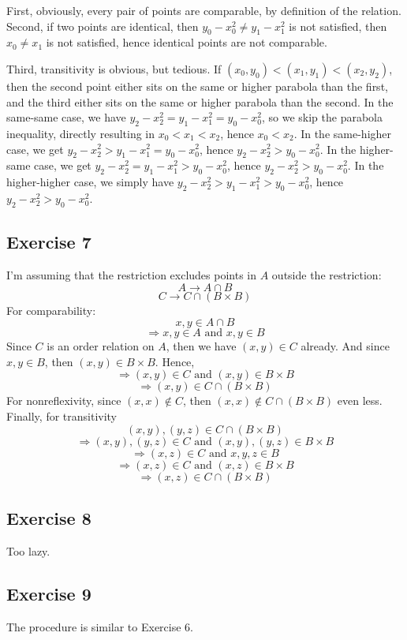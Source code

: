\documentclass{book}
\begin{document}
First, obviously, every pair of points are comparable, by definition of the relation. Second, if two points are identical, then $y_0 - x_0^2 \neq y_1 - x_1^2$ is not satisfied, then $x_0 \neq x_1$ is not satisfied, hence identical points are not comparable.

Third, transitivity is obvious, but tedious. If $(x_0, y_0) < (x_1, y_1) < (x_2, y_2)$, then the second point either sits on the same or higher parabola than the first, and the third either sits on the same or higher parabola than the second. In the same-same case, we have $y_2 - x_2^2 = y_1 - x_1^2 = y_0 - x_0^2$, so we skip the parabola inequality, directly resulting in $x_0 < x_1 < x_2$, hence $x_0 < x_2$. In the same-higher case, we get $y_2 - x_2^2 > y_1 - x_1^2 = y_0 - x_0^2$, hence $y_2 - x_2^2 > y_0 - x_0^2$. In the higher-same case, we get $y_2 - x_2^2 = y_1 - x_1^2 > y_0 - x_0^2$, hence $y_2 - x_2^2 > y_0 - x_0^2$. In the higher-higher case, we simply have $y_2 - x_2^2 > y_1 - x_1^2 > y_0 - x_0^2$, hence $y_2 - x_2^2 > y_0 - x_0^2$.

\subsection*{Exercise 7}
I'm assuming that the restriction excludes points in $A$ outside the restriction:
$$A \rightarrow A \cap B$$
$$C \rightarrow C \cap (B \times B)$$
For comparability:
$$x, y \in A \cap B$$
$$\Rightarrow x, y \in A \text{ and } x, y \in B$$
Since $C$ is an order relation on $A$, then we have $(x, y) \in C$ already. And since $x, y \in B$, then $(x, y) \in B \times B$. Hence,
$$\Rightarrow (x, y) \in C \text{ and } (x, y) \in B \times B$$
$$\Rightarrow (x, y) \in C \cap (B \times B)$$
For nonreflexivity, since $(x, x) \not \in C$, then $(x, x) \not \in C \cap (B \times B)$ even less. Finally, for transitivity
$$(x, y), (y, z) \in C \cap (B \times B)$$
$$\Rightarrow (x, y), (y, z) \in C \text{ and } (x, y), (y, z) \in B \times B$$
$$\Rightarrow (x, z) \in C \text{ and } x, y, z \in B$$
$$\Rightarrow (x, z) \in C \text{ and } (x, z) \in B \times B$$
$$\Rightarrow (x, z) \in C \cap (B \times B)$$

\subsection*{Exercise 8}
Too lazy.

\subsection*{Exercise 9}
The procedure is similar to Exercise 6.
\end{document}
